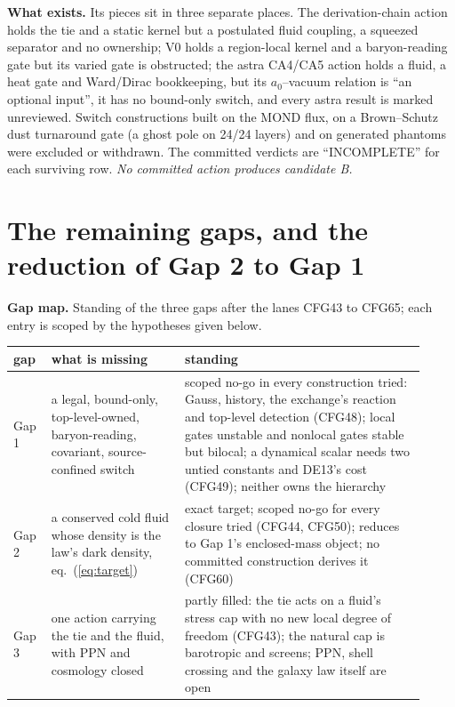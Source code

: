 \documentclass[10pt]{article}
\begin{document}
\textbf{What exists.} Its pieces sit in three separate places. The derivation-chain action holds the tie and a static kernel but a postulated fluid coupling, a squeezed separator and no ownership; V0 holds a region-local kernel and a baryon-reading gate but its varied gate is obstructed; the astra CA4/CA5 action holds a fluid, a heat gate and Ward/Dirac bookkeeping, but its $a_0$--vacuum relation is ``an optional input'', it has no bound-only switch, and every astra result is marked unreviewed. Switch constructions built on the MOND flux, on a Brown--Schutz dust turnaround gate (a ghost pole on 24/24 layers) and on generated phantoms were excluded or withdrawn. The committed verdicts are ``INCOMPLETE'' for each surviving row. \emph{No committed action produces candidate B.}

\section{The remaining gaps, and the reduction of Gap 2 to Gap 1}\label{sec:gaps}

\textbf{Gap map.} Standing of the three gaps after the lanes CFG43 to CFG65; each entry is scoped by the hypotheses given below.
\begin{center}\small
\begin{tabular}{p{0.08\linewidth}p{0.30\linewidth}p{0.54\linewidth}}
\toprule
gap & what is missing & standing \\
\midrule
Gap 1 & a legal, bound-only, top-level-owned, baryon-reading, covariant, source-confined switch & scoped no-go in every construction tried: Gauss, history, the exchange's reaction and top-level detection (CFG48); local gates unstable and nonlocal gates stable but bilocal; a dynamical scalar needs two untied constants and DE13's cost (CFG49); neither owns the hierarchy \\
Gap 2 & a conserved cold fluid whose density is the law's dark density, eq.~(\ref{eq:target}) & exact target; scoped no-go for every closure tried (CFG44, CFG50); reduces to Gap 1's enclosed-mass object; no committed construction derives it (CFG60) \\
Gap 3 & one action carrying the tie and the fluid, with PPN and cosmology closed & partly filled: the tie acts on a fluid's stress cap with no new local degree of freedom (CFG43); the natural cap is barotropic and screens; PPN, shell crossing and the galaxy law itself are open \\
\bottomrule
\end{tabular}
\end{center}
\end{document}
